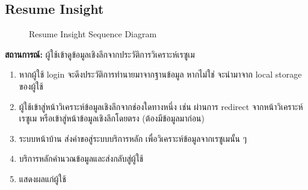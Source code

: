 \subsection{Resume Insight}
\begin{figure}[H]\centering
    \setlength{\fboxrule}{0.2mm} %
    \caption{Resume Insight Sequence Diagram}\label{fig:insightResumeSeqDiagram}
\end{figure}
\textbf{สถานการณ์: }ผู้ใช้เข้าดูข้อมูลเชิงลึกจากประวัติการวิเคราะห์เรซูเม
\begin{enumerate}
    \item หากผู้ใช้ login จะดึงประวัติการทำนายมาจากฐานข้อมูล หากไม่ใช่ จะนำมาจาก local storage ของผู้ใช้
    \item ผู้ใช้เข้าสู่หน้าวิเคราะห์ข้อมูลเชิงลึกจากช่องใดทางหนึ่ง เช่น ผ่านการ redirect จากหน้าวิเคราะห์เรซูเม หรือเข้าสู่หน้าข้อมูลเชิงลึกโดยตรง (ต้องมีข้อมูลมาก่อน)
    \item ระบบหน้าบ้าน ส่งคำขอสู่ระบบบริการหลัก เพื่อวิเคราะห์ข้อมูลจากเรซูเมนั้น ๆ
    \item บริการหลักคำนวณข้อมูลและส่งกลับสู่ผู้ใช้
    \item แสดงผลแก่ผู้ใช้
\end{enumerate}

